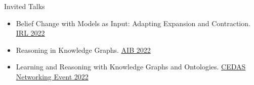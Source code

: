 \begin{rSection}{Invited Talks}
    \begin{itemize}
        \item Belief Change with Models as Input: Adapting Expansion and Contraction. \href{https://web.archive.org/web/20221205091252/https://irl.w.uib.no/}{IRL 2022}
        \item Reasoning in Knowledge Graphs. \href{https://researchschool.w.uib.no/}{AIB 2022}
        \item Learning and Reasoning with Knowledge Graphs and Ontologies. \href{https://web.archive.org/web/20221022003238/http://www.uib.no/en/cedas/154942/cedas-networking-event-2022#}{CEDAS Networking Event 2022}
    \end{itemize}
\end{rSection}
